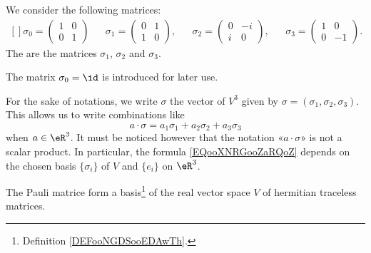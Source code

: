 \begin{definition}      \label{DEFooRNTDooTVkPtB}
	We consider the following matrices:
	\begin{equation}
		\begin{aligned}[]
			\sigma_0=\begin{pmatrix}
				         1 & 0 \\
				         0 & 1
			         \end{pmatrix} &  &
			\sigma_1=\begin{pmatrix}
				         0 & 1 \\
				         1 & 0
			         \end{pmatrix}, &  &
			\sigma_2=\begin{pmatrix}
				         0 & -i \\
				         i & 0
			         \end{pmatrix}, &  &
			\sigma_3=\begin{pmatrix}
				         1 & 0  \\
				         0 & -1
			         \end{pmatrix}.
		\end{aligned}
	\end{equation}
	The  are the matrices \( \sigma_1\), \( \sigma_2\) and \( \sigma_3\).
\end{definition}
The matrix \( \sigma_0=\id\) is introduced for later use.

For the sake of notations, we write \( \sigma\) the vector of \( V^3\) given by \( \sigma=(\sigma_1, \sigma_2, \sigma_3)\). This allows us to write combinations like
\begin{equation}        \label{EQooXNRGooZaRQoZ}
	a\cdot \sigma=a_1\sigma_1+a_2\sigma_2+a_3\sigma_3
\end{equation}
when \( a\in \eR^3\). It must be noticed however that the notation «\( a\cdot \sigma\)» is not a scalar product. In particular, the formula \eqref{EQooXNRGooZaRQoZ} depends on the chosen basis \( \{ \sigma_i \}\) of \( V\) and \( \{ e_i \}\) on \( \eR^3\).

\begin{lemma}       \label{LEMooZNCQooLgoReX}
	The Pauli matrice form a basis\footnote{Definition \ref{DEFooNGDSooEDAwTh}.} of the real vector space \( V\) of hermitian traceless matrices.
\end{lemma}

